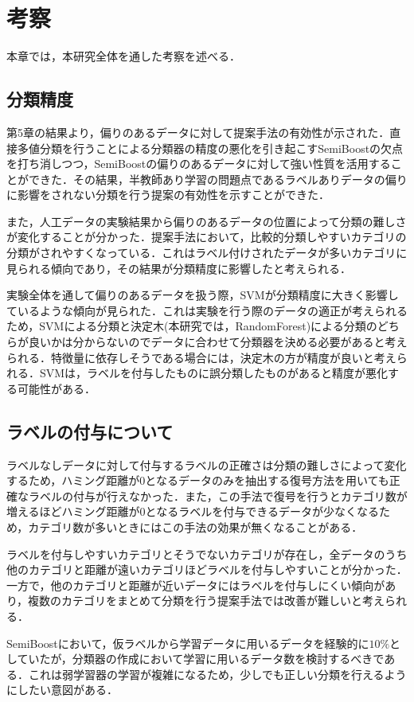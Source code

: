 \chapter{考察}
本章では，本研究全体を通した考察を述べる．
\section{分類精度}
第5章の結果より，偏りのあるデータに対して提案手法の有効性が示された．直接多値分類を行うことによる分類器の精度の悪化を引き起こすSemiBoostの欠点を打ち消しつつ，SemiBoostの偏りのあるデータに対して強い性質を活用することができた．その結果，半教師あり学習の問題点であるラベルありデータの偏りに影響をされない分類を行う提案の有効性を示すことができた．\par
また，人工データの実験結果から偏りのあるデータの位置によって分類の難しさが変化することが分かった．提案手法において，比較的分類しやすいカテゴリの分類がされやすくなっている．これはラベル付けされたデータが多いカテゴリに見られる傾向であり，その結果が分類精度に影響したと考えられる．\par

実験全体を通して偏りのあるデータを扱う際，SVMが分類精度に大きく影響しているような傾向が見られた．これは実験を行う際のデータの適正が考えられるため，SVMによる分類と決定木(本研究では，RandomForest)による分類のどちらが良いかは分からないのでデータに合わせて分類器を決める必要があると考えられる．特徴量に依存しそうである場合には，決定木の方が精度が良いと考えられる．SVMは，ラベルを付与したものに誤分類したものがあると精度が悪化する可能性がある．\par


\section{ラベルの付与について}
ラベルなしデータに対して付与するラベルの正確さは分類の難しさによって変化するため，ハミング距離が0となるデータのみを抽出する復号方法を用いても正確なラベルの付与が行えなかった．また，この手法で復号を行うとカテゴリ数が増えるほどハミング距離が0となるラベルを付与できるデータが少なくなるため，カテゴリ数が多いときにはこの手法の効果が無くなることがある．\par
ラベルを付与しやすいカテゴリとそうでないカテゴリが存在し，全データのうち他のカテゴリと距離が遠いカテゴリほどラベルを付与しやすいことが分かった．一方で，他のカテゴリと距離が近いデータにはラベルを付与しにくい傾向があり，複数のカテゴリをまとめて分類を行う提案手法では改善が難しいと考えられる．\par
SemiBoostにおいて，仮ラベルから学習データに用いるデータを経験的に$10\%$としていたが，分類器の作成において学習に用いるデータ数を検討するべきである．これは弱学習器の学習が複雑になるため，少しでも正しい分類を行えるようにしたい意図がある．\par

